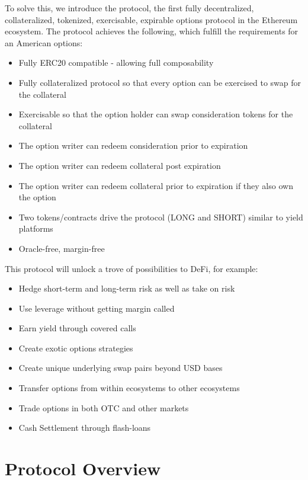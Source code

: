 To solve this, we introduce the \greekfi protocol, the first fully decentralized, collateralized, tokenized, exercisable, expirable options protocol in the Ethereum ecosystem.
The protocol achieves the following, which fulfill the requirements for an American options:
\begin{itemize}
  \setlength{\itemsep}{0pt}
  \setlength{\parskip}{0pt}
  \item Fully ERC20 compatible - allowing full composability
  \item Fully collateralized protocol so that every option can be exercised to swap for the collateral
  \item Exercisable so that the option holder can swap consideration tokens for the collateral
  \item The option writer can redeem consideration prior to expiration
  \item The option writer can redeem collateral post expiration
  \item The option writer can redeem collateral prior to expiration if they also own the option
  \item Two tokens/contracts drive the protocol (LONG and SHORT) similar to yield platforms
  \item Oracle-free, margin-free
\end{itemize}

This protocol will unlock a trove of possibilities to DeFi, for example:

\begin{itemize}
  \setlength{\itemsep}{0pt}
  \setlength{\parskip}{0pt}
  \item Hedge short-term and long-term risk as well as take on risk
  \item Use leverage without getting margin called
  \item Earn yield through covered calls
  \item Create exotic options strategies
  \item Create unique underlying swap pairs beyond USD bases
  \item Transfer options from within ecosystems to other ecosystems
  \item Trade options in both OTC and other markets
  \item Cash Settlement through flash-loans
\end{itemize}

\section{\label{sec:protocol}Protocol Overview}

